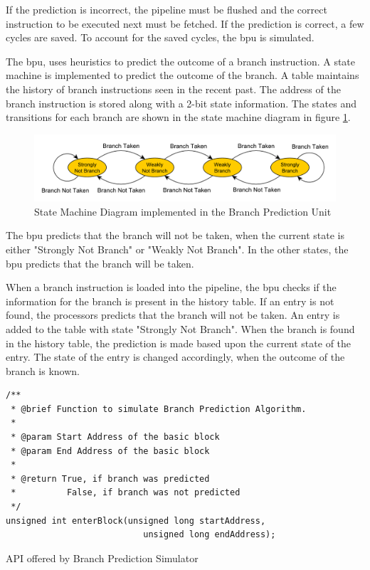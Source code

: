 If the prediction is incorrect, the pipeline must be flushed and the correct instruction to be executed next must be fetched. If the prediction is correct, a few cycles are saved. To account for the saved cycles, the \gls{bpu} is simulated.

The \gls{bpu}, uses heuristics to predict the outcome of a branch instruction. A state machine is implemented to predict the outcome of the branch. A table maintains the history of branch instructions seen in the recent past. The address of the branch instruction is stored along with a 2-bit state information. The states and transitions for each branch are shown in the state machine diagram in figure 
\ref{fig:bpuSMD}.

\begin{figure}[h]
\centering
\includegraphics[width=\textwidth]{figures/BranchPredictionSMD.pdf}
\caption{State Machine Diagram implemented in the Branch Prediction Unit}
\label{fig:bpuSMD}
\end{figure}

The \gls{bpu} predicts that the branch will not be taken, when the current state is either "Strongly Not Branch" or "Weakly Not Branch". In the other states, the \gls{bpu} predicts that the branch will be taken.

When a branch instruction is loaded into the pipeline, the \gls{bpu} checks if the information for the branch is present in the history table. If an entry is not found, the processors predicts that the branch will not be taken. An entry is added to the table with state "Strongly Not Branch". When the branch is found in the history table, the prediction is made based upon the current state of the entry. The state of the entry is changed accordingly, when the outcome of the branch is known.

\begin{Snippet}[h!]
\begin{lstlisting}
/**
 * @brief Function to simulate Branch Prediction Algorithm.
 *
 * @param Start Address of the basic block
 * @param End Address of the basic block
 *
 * @return True, if branch was predicted
 *          False, if branch was not predicted
 */
unsigned int enterBlock(unsigned long startAddress,
                           unsigned long endAddress);
\end{lstlisting}
\caption{API offered by Branch Prediction Simulator}
\label{snip:branchPredAPI}
\end{Snippet}

